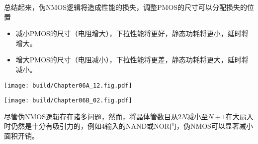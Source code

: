 总结起来，伪NMOS逻辑将造成性能的损失，调整PMOS的尺寸可以分配损失的位置
\begin{itemize}
    \item 减小PMOS的尺寸（电阻增大），下拉性能将更好，静态功耗将更小，延时将增大。
    \item 增大PMOS的尺寸（电阻减小），下拉性能将更差，静态功耗将更大，延时将减小。
\end{itemize}

\begin{Figure}[反相器的两种不同实现方式]
    \begin{FigureSub}[互补CMOS逻辑的反相器]
        \hspace{1cm}
        \texttt{[image: build/Chapter06A\_12.fig.pdf]}
        \hspace{1cm}
    \end{FigureSub}
    \begin{FigureSub}[伪NMOS逻辑的反相器]
        \hspace{1cm}
        \texttt{[image: build/Chapter06B\_02.fig.pdf]}
        \hspace{1cm}
    \end{FigureSub}
\end{Figure}

尽管伪NMOS逻辑存在诸多问题，然而，将晶体管数目从$2N$减小至$N+1$在大扇入时仍然是十分有吸引力的，例如4输入的NAND或NOR门，伪NMOS可以显著减小面积开销。